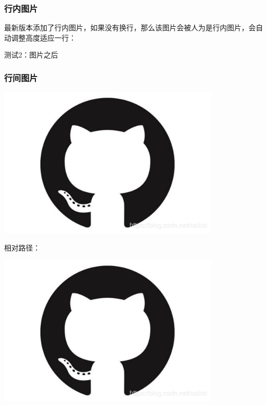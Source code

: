 \documentclass{article}
\begin{document}
\subsubsection{行内图片}




最新版本添加了行内图片，如果没有换行，那么该图片会被人为是行内图片，会自动调整高度适应一行：


测试2：图片之后


\subsubsection{行间图片}




\begin{center}
\vspace{\baselineskip}\includegraphics[width=0.8\textwidth]{images/1c59f8ef2aa3c5e527a22b7c258489d6.png}\vspace{\baselineskip}
\end{center}


相对路径：
\begin{center}
\vspace{\baselineskip}\includegraphics[width=0.8\textwidth]{images/ef84f157872e22d7cffcae03a00ea530.png}\vspace{\baselineskip}
\end{center}
\end{document}
